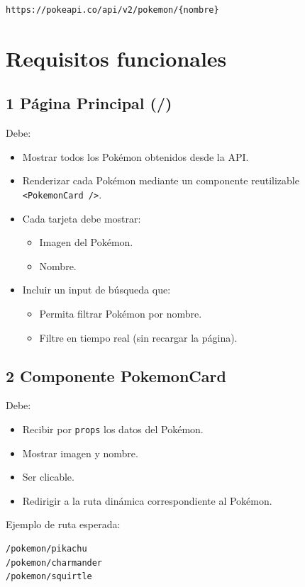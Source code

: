 \documentclass[12pt,a4paper]{article}
\begin{document}
\begin{verbatim}
https://pokeapi.co/api/v2/pokemon/{nombre}
\end{verbatim}

\section*{Requisitos funcionales}

\subsection*{1 Página Principal (/)}
Debe:

\begin{itemize}
    \item Mostrar todos los Pokémon obtenidos desde la API.
    \item Renderizar cada Pokémon mediante un componente reutilizable \texttt{<PokemonCard />}.
    \item Cada tarjeta debe mostrar:
    \begin{itemize}
        \item Imagen del Pokémon.
        \item Nombre.
    \end{itemize}
    \item Incluir un input de búsqueda que:
    \begin{itemize}
        \item Permita filtrar Pokémon por nombre.
        \item Filtre en tiempo real (sin recargar la página).
    \end{itemize}
\end{itemize}

\subsection*{2 Componente PokemonCard}
Debe:

\begin{itemize}
    \item Recibir por \texttt{props} los datos del Pokémon.
    \item Mostrar imagen y nombre.
    \item Ser clicable.
    \item Redirigir a la ruta dinámica correspondiente al Pokémon.
\end{itemize}

Ejemplo de ruta esperada:

\begin{verbatim}
/pokemon/pikachu
/pokemon/charmander
/pokemon/squirtle
\end{verbatim}
\end{document}
